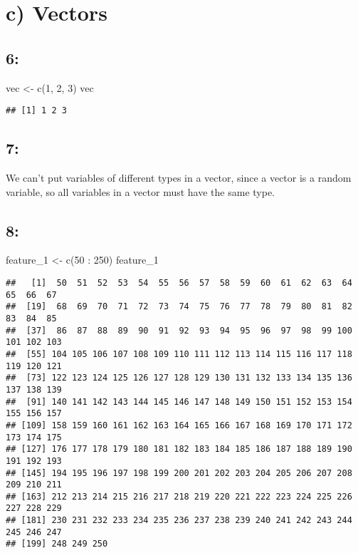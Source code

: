 \documentclass[
]{article}
\newenvironment{Shaded}{\begin{snugshade}}{\end{snugshade}}
\newcommand{\DecValTok}[1]{\textcolor[rgb]{0.00,0.00,0.81}{#1}}
\newcommand{\FunctionTok}[1]{\textcolor[rgb]{0.00,0.00,0.00}{#1}}
\newcommand{\NormalTok}[1]{#1}
\newcommand{\OtherTok}[1]{\textcolor[rgb]{0.56,0.35,0.01}{#1}}
\newcommand{\SpecialCharTok}[1]{\textcolor[rgb]{0.00,0.00,0.00}{#1}}
\begin{document}
\hypertarget{c-vectors}{%
\section{c) Vectors}\label{c-vectors}}

\hypertarget{section-5}{%
\subsection{6:}\label{section-5}}

\begin{Shaded}
\begin{Highlighting}[]
\NormalTok{vec }\OtherTok{\textless{}{-}} \FunctionTok{c}\NormalTok{(}\DecValTok{1}\NormalTok{, }\DecValTok{2}\NormalTok{, }\DecValTok{3}\NormalTok{)}
\NormalTok{vec}
\end{Highlighting}
\end{Shaded}

\begin{verbatim}
## [1] 1 2 3
\end{verbatim}

\hypertarget{section-6}{%
\subsection{7:}\label{section-6}}

We can't put variables of different types in a vector, since a vector is
a random variable, so all variables in a vector must have the same type.

\hypertarget{section-7}{%
\subsection{8:}\label{section-7}}

\begin{Shaded}
\begin{Highlighting}[]
\NormalTok{feature\_1 }\OtherTok{\textless{}{-}} \FunctionTok{c}\NormalTok{(}\DecValTok{50} \SpecialCharTok{:} \DecValTok{250}\NormalTok{)}
\NormalTok{feature\_1}
\end{Highlighting}
\end{Shaded}

\begin{verbatim}
##   [1]  50  51  52  53  54  55  56  57  58  59  60  61  62  63  64  65  66  67
##  [19]  68  69  70  71  72  73  74  75  76  77  78  79  80  81  82  83  84  85
##  [37]  86  87  88  89  90  91  92  93  94  95  96  97  98  99 100 101 102 103
##  [55] 104 105 106 107 108 109 110 111 112 113 114 115 116 117 118 119 120 121
##  [73] 122 123 124 125 126 127 128 129 130 131 132 133 134 135 136 137 138 139
##  [91] 140 141 142 143 144 145 146 147 148 149 150 151 152 153 154 155 156 157
## [109] 158 159 160 161 162 163 164 165 166 167 168 169 170 171 172 173 174 175
## [127] 176 177 178 179 180 181 182 183 184 185 186 187 188 189 190 191 192 193
## [145] 194 195 196 197 198 199 200 201 202 203 204 205 206 207 208 209 210 211
## [163] 212 213 214 215 216 217 218 219 220 221 222 223 224 225 226 227 228 229
## [181] 230 231 232 233 234 235 236 237 238 239 240 241 242 243 244 245 246 247
## [199] 248 249 250
\end{verbatim}
\end{document}
